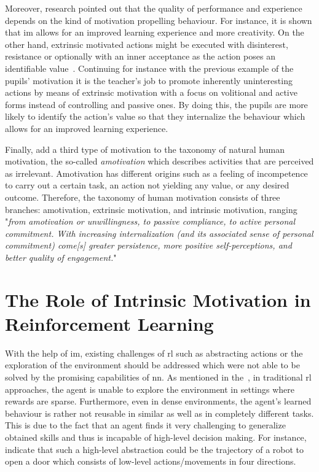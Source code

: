 \documentclass[draft,final]{vutinfth} %
\newcommand{\p}[1]{see p. #1}
\begin{document}
    Moreover, research pointed out that the quality of performance and experience depends on the kind of motivation propelling behaviour.
    For instance, it is shown that \gls{im} allows for an improved learning experience and more creativity.
    On the other hand, extrinsic motivated actions might be executed with disinterest, resistance or optionally with an inner acceptance as the action poses an identifiable value~\citep{ryan_intrinsic_2000}.
    Continuing for instance with the previous example of the pupils' motivation it is the teacher's job to promote inherently uninteresting actions by means of extrinsic motivation with a focus on volitional and active forms instead of controlling and passive ones.
    By doing this, the pupils are more likely to identify the action's value so that they internalize the behaviour which allows for an improved learning experience.

    Finally, \citeauthor{ryan_intrinsic_2000} add a third type of motivation to the taxonomy of natural human motivation, the so-called \textit{amotivation} which describes activities that are perceived as irrelevant.
    Amotivation has different origins such as a feeling of incompetence to carry out a certain task, an action not yielding any value, or any desired outcome.
    Therefore, the taxonomy of human motivation consists of three branches: amotivation, extrinsic motivation, and intrinsic motivation, ranging "\textit{from amotivation or unwillingness, to passive compliance, to active personal commitment. With increasing internalization (and its associated sense of personal commitment) come[s] greater persistence, more positive self-perceptions, and better quality of engagement.}"~\citep[\p{60f}]{ryan_intrinsic_2000}


    \section{The Role of Intrinsic Motivation in Reinforcement Learning}

    With the help of \gls{im}, existing challenges of \gls{rl} such as abstracting actions or the exploration of the environment should be addressed which were not able to be solved by the promising capabilities of \gls{nn}.
    As mentioned in the~, in traditional \gls{rl} approaches, the agent is unable to explore the environment in settings where rewards are sparse.
    Furthermore, even in dense environments, the agent's learned behaviour is rather not reusable in similar as well as in completely different tasks.
    This is due to the fact that an agent finds it very challenging to generalize obtained skills and thus is incapable of high-level decision making.
    For instance, \citeauthor{todorov_mujoco_2012} indicate that such a high-level abstraction could be the trajectory of a robot to open a door which consists of low-level actions/movements in four directions.
\end{document}
